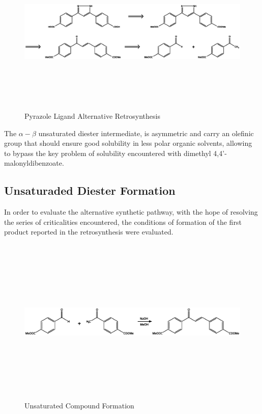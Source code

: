 \documentclass[../Master.tex]{subfiles}
\begin{document}
\begin{figure}[h!]
	\centering
	\includegraphics[width=16cm,height=8cm,keepaspectratio]{Structures/pyrazole-retro-alt.eps}
	\caption{Pyrazole Ligand Alternative Retrosynthesis}\label{fig:pyrazole-retro-alt}
\end{figure}

The \(\alpha-\beta\) unsaturated diester intermediate, is asymmetric and carry an olefinic group that should ensure good solubility in less polar organic solvents, allowing to bypass the key problem of solubility encountered with dimethyl 4,4’-malonyldibenzoate.

\subsection{Unsaturaded Diester Formation}\label{sec:alt-pyr-diest}

In order to evaluate the alternative synthetic pathway, with the hope of resolving the series of criticalities encountered, the conditions of formation of the first product reported in the retrosynthesis were evaluated.

\begin{figure}[h!]
	\centering
	\includegraphics[width=16cm,height=8cm,keepaspectratio]{Structures/unsaturated-synt.eps}
	\caption{Unsaturated Compound Formation}
\end{figure}
\end{document}

